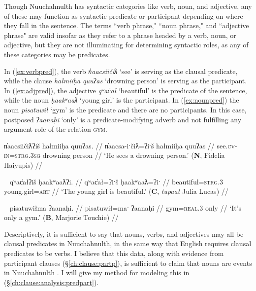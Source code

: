 Though Nuuchahnulth has syntactic categories like verb, noun, and adjective, any of these may function as syntactic predicate or participant depending on where they fall in the sentence. The terms ``verb phrase," ``noun phrase," and ``adjective phrase" are valid insofar as they refer to a phrase headed by a verb, noun, or adjective, but they are not illuminating for determining syntactic roles, as any of these categories may be predicates.

In (\ref{ex:verbpred}), the verb \textit{n̓aacsiičiƛ} `see' is serving as the clausal predicate, while the clause \textit{hałmiiḥa quuʔas} `drowning person' is serving as the participant. In (\ref{ex:adjpred}), the adjective \textit{qʷac̓ał} `beautiful' is the predicate of the sentence, while the noun \textit{ḥaakʷaaƛ} `young girl' is the participant. In (\ref{ex:nounpred}) the noun \textit{pisatuwił} `gym' is the predicate and there are no participants. In this case, postposed \textit{ʔaanaḥi} `only' is a predicate-modifying adverb and not fulfilling any argument role of the relation \textsc{gym}.

\begin{comment}
While all three words have semantic relations (\textsc{see}, \textsc{drown}, \textsc{person}), only one is the syntactic predicate of the sentence.	
\end{comment}

\ex \label{ex:verbpred}
\begingl
\glpreamble n̓aacsiičiƛʔiš hałmiiḥa quuʔas. //
\gla n̓aacsa-iˑčiƛ=ʔiˑš hałmiiḥa quuʔas //
\glb see.\textsc{cv}-\textsc{in}=\textsc{strg.3sg} drowning person //
\glft `He sees a drowning person.' (\textbf{N}, Fidelia Haiyupis) //
\endgl
\xe

\ex~ \label{ex:adjpred}
\begingl
\glpreamble qʷac̓ałʔiš ḥaakʷaaƛʔi. //
\gla qʷac̓ał=ʔiˑš ḥaakʷaaƛ=ʔiˑ //
\glb beautiful=\textsc{strg.3} young.girl=\textsc{art} //
\glft `The young girl is beautiful.' (\textbf{C}, \textit{tupaat} Julia Lucas) //
\endgl
\xe

\ex~ \label{ex:nounpred}
\begingl
\glpreamble pisatuwiłma ʔaanaḥi. //
\gla pisatuwił=maˑ ʔaanaḥi //
\glb gym=\textsc{real.3} only //
\glft `It's only a gym.' (\textbf{B}, Marjorie Touchie) //
\endgl
\xe

Descriptively, it is sufficient to say that nouns, verbs, and adjectives may all be clausal predicates in Nuuchahnulth, in the same way that English requires clausal predicates to be verbs. I believe that this data, along with evidence from participant clauses (\S\ref{ch:clause:partp}), is sufficient to claim that nouns are events in Nuuchahnulth \citep{inman2018}. I will give my method for modeling this in (\S\ref{ch:clause:analysis:predpart}).

